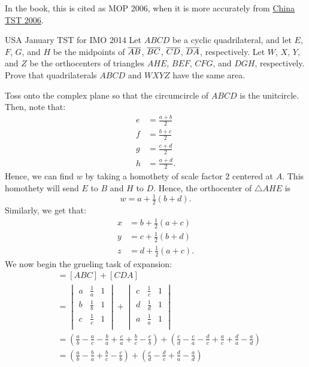 \documentclass{article}
\begin{document}
\begin{remark*}
In the book, this is cited as MOP 2006, when it is more accurately from \href{https://artofproblemsolving.com/community/q2h97504p26374966}{\color{red} China TST 2006}.
\end{remark*}

\begin{problem}[6.37]{USA January TST for IMO 2014}
Let $ABCD$ be a cyclic quadrilateral, and let $E$, $F$, $G$, and $H$ be the midpoints of $\overline{AB}$, $\overline{BC}$, $\overline{CD}$, $\overline{DA}$, respectively. Let $W$, $X$, $Y$, and $Z$ be the orthocenters of triangles $AHE$, $BEF$, $CFG$, and $DGH$, respectively. Prove that quadrilaterals $ABCD$ and $WXYZ$ have the same area.
\end{problem}

Toss onto the complex plane so that the circumcircle of $ABCD$ is the unitcircle. Then, note that:
\begin{align*}
e &= \tfrac{a+b}{2} \\
f &= \tfrac{b+c}{2} \\
g &= \tfrac{c+d}{2} \\
h &= \tfrac{a+d}{2}.
\end{align*}
Hence, we can find $w$ by taking a homothety of scale factor $2$ centered at $A$. This homothety will send $E$ to $B$ and $H$ to $D$. Hence, the orthocenter of $\triangle AHE$ is \[w = a+\tfrac{1}{2}(b+d).\] Similarly, we get that:
\begin{align*}
x &= b+\tfrac{1}{2}(a+c) \\
y &= c+\tfrac{1}{2}(b+d) \\
z &= d+\tfrac{1}{2}(a+c).
\end{align*}
We now begin the grueling task of expansion:
\begin{align*}
[ABCD] &= [ABC]+[CDA] \\
&= \begin{vmatrix}a&\tfrac{1}{a}&1\\[3pt]b&\tfrac{1}{b}&1\\[3pt]c&\tfrac{1}{c}&1\\\end{vmatrix} + \begin{vmatrix}c&\tfrac{1}{c}&1\\[3pt]d&\tfrac{1}{d}&1\\[3pt]a&\tfrac{1}{a}&1\\\end{vmatrix} \\
&= \left(\tfrac{a}{b}-\tfrac{a}{c}-\tfrac{b}{a}+\tfrac{c}{a}+\tfrac{b}{c}-\tfrac{c}{b}\right) + \left(\tfrac{c}{d}-\tfrac{c}{a}-\tfrac{d}{c}+\tfrac{a}{c}+\tfrac{d}{a}-\tfrac{a}{d}\right) \\
&= \left(\tfrac{a}{b}-\tfrac{b}{a}+\tfrac{b}{c}-\tfrac{c}{b}\right) + \left(\tfrac{c}{d}-\tfrac{d}{c}+\tfrac{d}{a}-\tfrac{a}{d}\right)
\end{align*}
\end{document}
